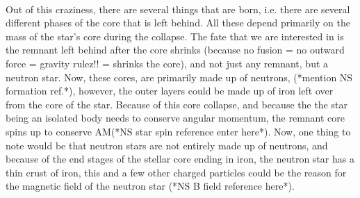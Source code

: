 \documentclass[a4paper,twoside]{report}
\numberwithin{equation}{section}
\begin{document}
\paragraph{}
Out of this craziness, there are several things that are born, i.e. there are several different phases of the core that is left behind. All these depend primarily on the mass of the star's core during the collapse. The fate that we are interested in is the remnant left behind after the core shrinks (because no fusion = no outward force = gravity rulez!! = shrinks the core), and not just any remnant, but a neutron star. Now, these cores, are primarily made up of neutrons, (*mention NS formation ref.*), however, the outer layers could be made up of iron left over from the core of the star. Because of this core collapse, and because the the star being an isolated body needs to conserve angular momentum, the remnant core spins up to conserve AM(*NS star spin reference enter here*). Now, one thing to note would be that neutron stars are not entirely made up of neutrons, and because of the end stages of the stellar core ending in iron, the neutron star has a thin crust of iron, this and a few other charged particles could be the reason for the magnetic field of the neutron star (*NS B field reference here*). 
\end{document}
